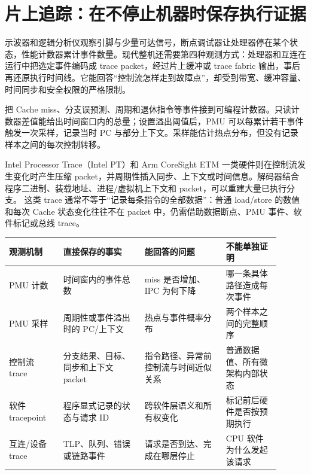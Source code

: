 \section{片上追踪：在不停止机器时保存执行证据}

示波器和逻辑分析仪观察引脚与少量可达信号，断点调试器让处理器停在某个状态，性能计数器累计事件数量。现代整机还需要第四种观测方式：处理器和互连在运行中把选定事件编码成 trace packet，经过片上缓冲或 trace fabric 输出，事后再还原执行时间线。它能回答“控制流怎样走到故障点”，却受到带宽、缓冲容量、时间同步和安全权限的严格限制。


把 Cache miss、分支误预测、周期和退休指令等事件接到可编程计数器。只读计数器差值能给出时间窗口内的总量；设置溢出阈值后，PMU 可以每累计若干事件触发一次采样，记录当时 PC 与部分上下文。采样能估计热点分布，但没有记录样本之间的每次控制转移。

Intel Processor Trace（Intel PT）和 Arm CoreSight ETM 一类硬件则在控制流发生变化时产生压缩 packet，并周期性插入同步、上下文或时间信息。解码器结合程序二进制、装载地址、进程/虚拟机上下文和 packet，可以重建大量已执行分支。\cite{intel-pt}\cite{arm-trace} 这类 trace 通常不等于“记录每条指令的全部数据”：普通 load/store 的数值和每次 Cache 状态变化往往不在 packet 中，仍需借助数据断点、PMU 事件、软件标记或总线 trace。

\begin{longtable}{L{0.18\linewidth}L{0.27\linewidth}L{0.27\linewidth}L{0.18\linewidth}}
\toprule
观测机制 & 直接保存的事实 & 能回答的问题 & 不能单独证明 \\
\midrule
PMU 计数 & 时间窗内的事件总数 & miss 是否增加、IPC 为何下降 & 哪一条具体路径造成每次事件 \\\tablerowrule
PMU 采样 & 周期性或事件溢出时的 PC/上下文 & 热点与事件概率分布 & 两个样本之间的完整顺序 \\\tablerowrule
控制流 trace & 分支结果、目标、同步和上下文 packet & 指令路径、异常前控制流与时间近似关系 & 普通数据值、所有微架构内部状态 \\\tablerowrule
软件 tracepoint & 程序显式记录的状态与请求 ID & 跨软件层语义和所有权变化 & 标记前后硬件是否按预期执行 \\\tablerowrule
互连/设备 trace & TLP、队列、错误或链路事件 & 请求是否到达、完成在哪层停止 & CPU 软件为什么发起该请求 \\
\bottomrule
\end{longtable}

